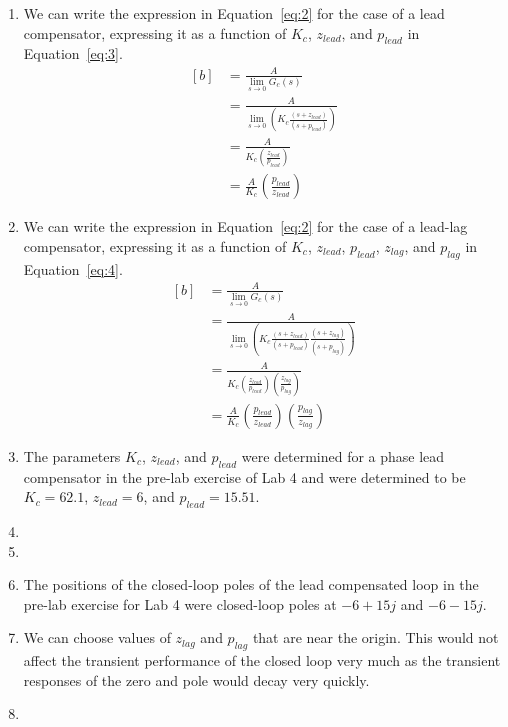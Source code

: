 \documentclass[12pt]{article}
\begin{document}
\begin{enumerate}
	\item %
	We can write the expression in Equation~\ref{eq:2} for the case of a lead compensator, expressing it as a function of $K_c$, $z_{lead}$, and $p_{lead}$ in Equation~\ref{eq:3}.
	\begin{equation} \label{eq:3}
	\begin{aligned}[b]
		&= \frac{A}{\lim_{s \to 0}G_c(s)} \\
		&= \frac{A}{\lim_{s \to 0} \left( K_c \frac{(s+z_{lead})}{(s+p_{lead})} \right)} \\
		&= \frac{A}{K_c \left( \frac{z_{lead}}{p_{lead}} \right)} \\
		&= \frac{A}{K_c} \left( \frac{p_{lead}}{z_{lead}} \right)
	\end{aligned}
	\end{equation}
	
	\item %
	We can write the expression in Equation~\ref{eq:2} for the case of a lead-lag compensator, expressing it as a function of $K_c$, $z_{lead}$, $p_{lead}$, $z_{lag}$, and $p_{lag}$ in Equation~\ref{eq:4}.
	\begin{equation} \label{eq:4}
		\begin{aligned}[b]
			&= \frac{A}{\lim_{s \to 0}G_c(s)} \\
			&= \frac{A}{\lim_{s \to 0} \left( K_c \frac{(s+z_{lead})}{(s+p_{lead})} \frac{(s+z_{lag})}{(s+p_{lag})} \right)} \\
			&= \frac{A}{K_c \left ( \frac{z_{lead}}{p_{lead}} \right) \left( \frac{z_{lag}}{p_{lag}} \right)} \\
			&= \frac{A}{K_c} \left( \frac{p_{lead}}{z_{lead}} \right) \left( \frac{p_{lag}}{z_{lag}} \right)
		\end{aligned}
		\end{equation}
	
	\item %
	The parameters $K_c$, $z_{lead}$, and $p_{lead}$ were determined for a phase lead compensator in the pre-lab exercise of Lab 4 and were determined to be $K_c = 62.1$, $z_{lead} = 6$, and $p_{lead} = 15.51$.
	
	\item %
	
	\item %

	\item %
	The positions of the closed-loop poles of the lead compensated loop in the pre-lab exercise for Lab 4 were closed-loop poles at $-6 + 15j$ and $-6 - 15j$.
	
	\item %
	We can choose values of $z_{lag}$ and $p_{lag}$ that are near the origin. This would not affect the transient performance of the closed loop very much as the transient responses of the zero and pole would decay very quickly. 
	
	\item %
	
\end{enumerate}
\end{document}
